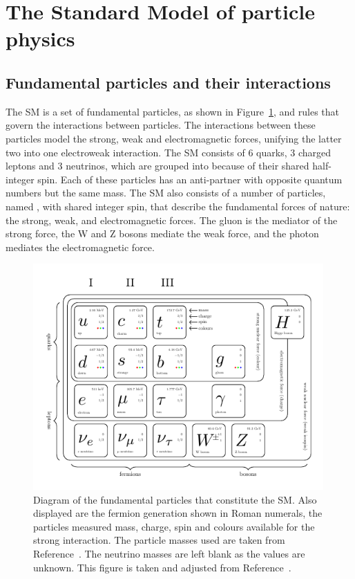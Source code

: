 \section{The Standard Model of particle physics}

\subsection{Fundamental particles and their interactions}

The \ac{SM} is a set of fundamental particles, as shown in Figure~\ref{fig:sm_diagram}, and rules that govern the interactions between particles.
The interactions between these particles model the strong, weak and electromagnetic forces, unifying the latter two into one electroweak interaction.
The \ac{SM} consists of 6 quarks, 3 charged leptons and 3 neutrinos, which are grouped into  because of their shared half-integer spin. 
Each of these particles has an anti-partner with opposite quantum numbers but the same mass.
The \ac{SM} also consists of a number of particles, named , with shared integer spin, that describe the fundamental forces of nature: the strong, weak, and electromagnetic forces. 
The gluon is the mediator of the strong force, the W and Z bosons mediate the weak force, and the photon mediates the electromagnetic force. \\

\begin{figure}[!hbtp]
\centering
    \includegraphics[width=0.99\textwidth]{Figures/SM_diagram.pdf}
\caption{Diagram of the fundamental particles that constitute the SM. Also displayed are the fermion generation shown in Roman numerals, the particles measured mass, charge, spin and colours available for the strong interaction. The particle masses used are taken from Reference~\cite{ParticleDataGroup:2022pth}. The neutrino masses are left blank as the values are unknown. This figure is taken and adjusted from Reference~\cite{sm_diagram}.}
\label{fig:sm_diagram}
\end{figure}

